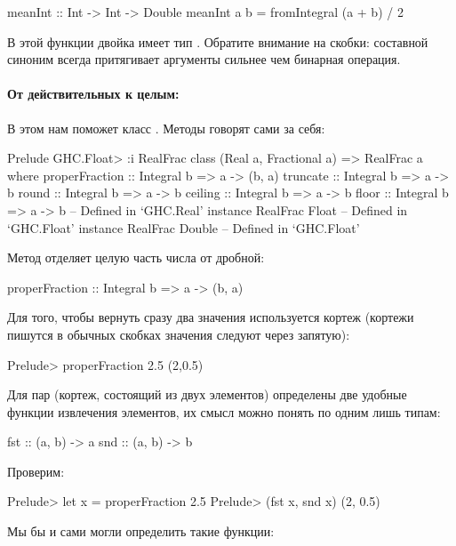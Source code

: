 \begin{code}
meanInt :: Int -> Int -> Double
meanInt a b = fromIntegral (a + b) / 2
\end{code}

В этой функции двойка имеет тип . Обратите 
внимание на скобки: составной синоним всегда притягивает аргументы
сильнее чем бинарная операция.


\paragraph{От действительных к целым:} В этом нам поможет
класс . Методы говорят сами за себя:

\begin{code}
Prelude GHC.Float> :i RealFrac
class (Real a, Fractional a) => RealFrac a where
  properFraction :: Integral b => a -> (b, a)
  truncate :: Integral b => a -> b
  round :: Integral b => a -> b
  ceiling :: Integral b => a -> b
  floor :: Integral b => a -> b
  	-- Defined in `GHC.Real'
instance RealFrac Float -- Defined in `GHC.Float'
instance RealFrac Double -- Defined in `GHC.Float'
\end{code}

Метод  отделяет целую часть числа от дробной:

\begin{code}
properFraction :: Integral b => a -> (b, a)
\end{code}

Для того, чтобы вернуть сразу два значения используется
кортеж (кортежи пишутся в обычных скобках значения следуют
через запятую):

\begin{code}
Prelude> properFraction 2.5
(2,0.5)
\end{code}

Для пар (кортеж, состоящий из двух элементов) определены
две удобные функции извлечения элементов, их смысл 
можно понять по одним лишь типам:

\begin{code}
fst :: (a, b) -> a
snd :: (a, b) -> b
\end{code}

Проверим:

\begin{code}
Prelude> let x = properFraction 2.5
Prelude> (fst x, snd x)
(2, 0.5)
\end{code}

Мы бы и сами могли определить такие функции:


